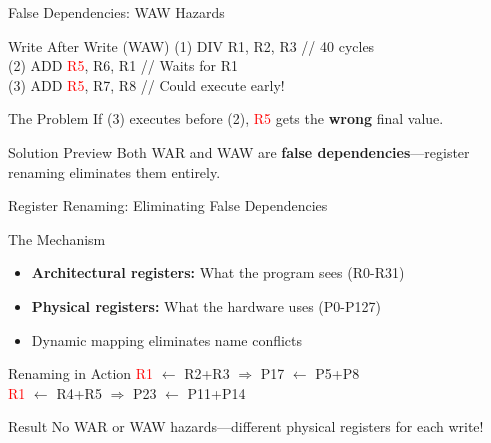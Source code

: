 \documentclass[aspectratio=169,12pt]{beamer}
\begin{document}
\begin{frame}{False Dependencies: WAW Hazards}
    \begin{exampleblock}{Write After Write (WAW)}
        {\ttfamily\footnotesize
        (1) DIV R1, R2, R3  // 40 cycles\\
        (2) ADD \textcolor{red}{R5}, R6, R1  // Waits for R1\\
        (3) ADD \textcolor{red}{R5}, R7, R8  // Could execute early!
        }
    \end{exampleblock}
    
    \begin{block}{The Problem}
        If (3) executes before (2), \textcolor{red}{R5} gets the \textbf{wrong} final value.
    \end{block}
    
    \begin{alertblock}{Solution Preview}
        Both WAR and WAW are \textbf{false dependencies}—register renaming eliminates them entirely.
    \end{alertblock}
\end{frame}

\begin{frame}{Register Renaming: Eliminating False Dependencies}
    \begin{block}{The Mechanism}
        \begin{itemize}
            \item \textbf{Architectural registers:} What the program sees (R0-R31)
            \item \textbf{Physical registers:} What the hardware uses (P0-P127)
            \item Dynamic mapping eliminates name conflicts
        \end{itemize}
    \end{block}
    
    \begin{exampleblock}{Renaming in Action}
        {\ttfamily\small
        \textcolor{red}{R1} $\leftarrow$ R2+R3  $\Rightarrow$  \textcolor{correctgreen}{P17} $\leftarrow$ P5+P8\\
        \textcolor{red}{R1} $\leftarrow$ R4+R5  $\Rightarrow$  \textcolor{correctgreen}{P23} $\leftarrow$ P11+P14
        }
    \end{exampleblock}
    
    \begin{alertblock}{Result}
        No WAR or WAW hazards—different physical registers for each write!
    \end{alertblock}
\end{frame}
\end{document}
